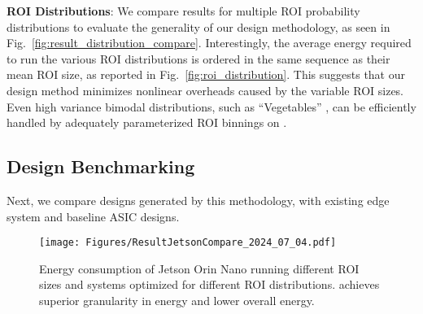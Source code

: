 \textbf{ROI Distributions}: We compare results for multiple ROI probability distributions to evaluate the generality of our design methodology, as seen in Fig.~\ref{fig:result_distribution_compare}.
Interestingly, the average energy required to run the various ROI distributions is ordered in the same sequence as their mean ROI size, as reported in Fig.~\ref{fig:roi_distribution}.
This suggests that our design method minimizes nonlinear overheads caused by the variable ROI sizes.
Even high variance bimodal distributions, such as ``Vegetables'' \cite{epic_kitchens}, can be efficiently handled by adequately parameterized ROI binnings on \projname{}.

\subsection{Design Benchmarking}

Next, we compare designs generated by this methodology, with existing edge system and baseline ASIC designs.

\begin{figure}
    \centering
    \texttt{[image: Figures/ResultJetsonCompare\_2024\_07\_04.pdf]}
    \caption{Energy consumption of Jetson Orin Nano running different ROI sizes and \projname{} systems optimized for different ROI distributions. \projname{} achieves superior granularity in energy and lower overall energy.}
    \label{fig:jetson_compare}
\end{figure}

